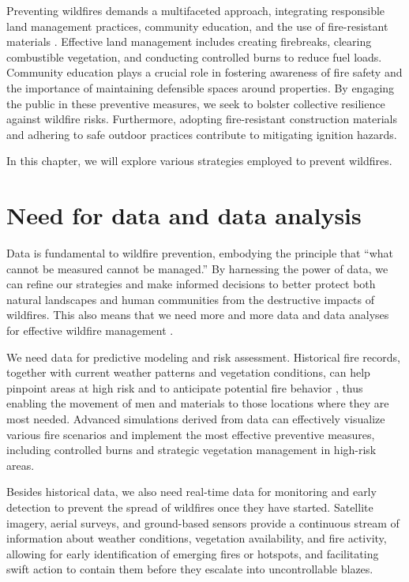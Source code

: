 \documentclass[
  12 pt,
]{Nemilov}
\begin{document}
Preventing wildfires demands a multifaceted approach, integrating responsible land management practices, community education, and the use of fire-resistant materials \citep{hesseln2018wildland}. Effective land management includes creating firebreaks, clearing combustible vegetation, and conducting controlled burns to reduce fuel loads. Community education plays a crucial role in fostering awareness of fire safety and the importance of maintaining defensible spaces around properties. By engaging the public in these preventive measures, we seek to bolster collective resilience against wildfire risks. Furthermore, adopting fire-resistant construction materials and adhering to safe outdoor practices contribute to mitigating ignition hazards.

In this chapter, we will explore various strategies employed to prevent wildfires.

\section{Need for data and data analysis}\label{need-for-data-and-data-analysis}

Data is fundamental to wildfire prevention, embodying the principle that ``what cannot be measured cannot be managed.'' By harnessing the power of data, we can refine our strategies and make informed decisions to better protect both natural landscapes and human communities from the destructive impacts of wildfires. This also means that we need more and more data and data analyses for effective wildfire management \citep{bowman2018wildfire}.

We need data for predictive modeling and risk assessment. Historical fire records, together with current weather patterns and vegetation conditions, can help pinpoint areas at high risk and to anticipate potential fire behavior \citep{ankur2018generation}, thus enabling the movement of men and materials to those locations where they are most needed. Advanced simulations derived from data can effectively visualize various fire scenarios and implement the most effective preventive measures, including controlled burns and strategic vegetation management in high-risk areas.

Besides historical data, we also need real-time data for monitoring and early detection to prevent the spread of wildfires once they have started. Satellite imagery, aerial surveys, and ground-based sensors provide a continuous stream of information about weather conditions, vegetation availability, and fire activity, allowing for early identification of emerging fires or hotspots, and facilitating swift action to contain them before they escalate into uncontrollable blazes.
\end{document}
